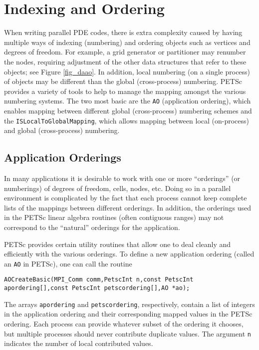 \section{Indexing and Ordering}
\label{sec_indexingandordering}

  When writing parallel PDE codes, there is extra complexity caused by
having multiple ways of indexing (numbering) and ordering objects such
as vertices and degrees of freedom. For example, a grid generator
or partitioner may renumber the nodes, requiring adjustment of the
other data structures that refer to these objects; see Figure
\ref{fig_daao}.  In addition, local numbering (on a single process)
of objects may be different than the global (cross-process)
numbering. PETSc provides a variety of tools to help to manage the
mapping amongst the various numbering systems. The two most basic are
the \lstinline{AO} (application ordering), which enables mapping between
different global (cross-process) numbering schemes and the \lstinline{ISLocalToGlobalMapping}, which allows mapping between local
(on-process) and global (cross-process) numbering.

\subsection{Application Orderings}
\label{sec_ao}

In many applications it is desirable to work with one or more
``orderings'' (or numberings) of degrees of freedom, cells, nodes,
etc.   Doing so in a parallel environment is
complicated by the fact that each process cannot keep complete lists
of the mappings between different orderings. In addition, the
orderings used in the PETSc linear algebra routines (often contiguous
ranges) may not correspond to the ``natural'' orderings for the application.

PETSc provides certain utility routines that allow one to deal cleanly
and efficiently with the various orderings. To define a new application ordering
(called an \lstinline{AO} in PETSc), one can call the routine
\begin{lstlisting}
AOCreateBasic(MPI_Comm comm,PetscInt n,const PetscInt apordering[],const PetscInt petscordering[],AO *ao);
\end{lstlisting}
The arrays \lstinline{apordering} and \lstinline{petscordering}, respectively, contain a list of integers
in the application ordering and their corresponding mapped values in the PETSc
ordering. Each process can provide whatever subset of the ordering it
chooses, but multiple processes should never contribute duplicate values.
The argument \lstinline{n} indicates the number of local contributed values.


